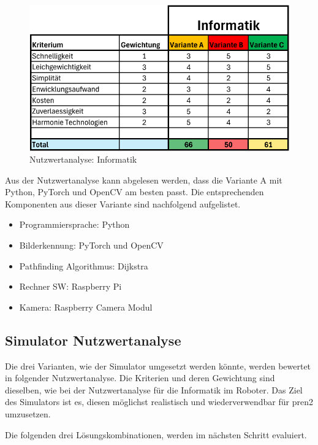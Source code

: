 \begin{figure}[H]
\centering
\includegraphics[width=\textwidth]{assets/Nutzwertanalyse-I.pdf}
\caption{Nutzwertanalyse: Informatik}
\label{fig:nutzwert-informatik}
\end{figure}

Aus der Nutzwertanalyse kann abgelesen werden, dass die Variante A mit Python, PyTorch und OpenCV am besten passt. Die entsprechenden Komponenten aus dieser Variante sind nachfolgend aufgelistet.

\begin{itemize}
    \item Programmiersprache: Python
    \item Bilderkennung: PyTorch und OpenCV
    \item Pathfinding Algorithmus: Dijkstra
    \item Rechner SW: Raspberry Pi
    \item Kamera: Raspberry Camera Modul
\end{itemize}

\subsection{Simulator Nutzwertanalyse}

Die drei Varianten, wie der Simulator umgesetzt werden könnte, werden bewertet in folgender Nutzwertanalyse. Die Kriterien und deren Gewichtung sind dieselben, wie bei der Nutzwertanalyse für die Informatik im Roboter. Das Ziel des Simulators ist es, diesen möglichst realistisch und wiederverwendbar für \acrshort{pren2} umzusetzen.


Die folgenden drei Lösungskombinationen, werden im nächsten Schritt evaluiert.

